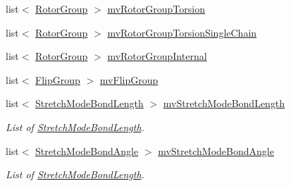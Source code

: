 \begin{DoxyCompactItemize}
\item 
list$<$ \mbox{\hyperlink{struct_obj_cryst_1_1_molecule_1_1_rotor_group}{Rotor\+Group}} $>$ \mbox{\hyperlink{class_obj_cryst_1_1_molecule_afc51d36109a8d96a626f3c2251345c13}{mv\+Rotor\+Group\+Torsion}}
\item 
list$<$ \mbox{\hyperlink{struct_obj_cryst_1_1_molecule_1_1_rotor_group}{Rotor\+Group}} $>$ \mbox{\hyperlink{class_obj_cryst_1_1_molecule_a22a07ddc2dbfeb90238b29bcca1e915d}{mv\+Rotor\+Group\+Torsion\+Single\+Chain}}
\item 
list$<$ \mbox{\hyperlink{struct_obj_cryst_1_1_molecule_1_1_rotor_group}{Rotor\+Group}} $>$ \mbox{\hyperlink{class_obj_cryst_1_1_molecule_ac54d8a074549f7710a1823b0ecefcde8}{mv\+Rotor\+Group\+Internal}}
\item 
list$<$ \mbox{\hyperlink{struct_obj_cryst_1_1_molecule_1_1_flip_group}{Flip\+Group}} $>$ \mbox{\hyperlink{class_obj_cryst_1_1_molecule_a79ffe8ba3222a5f4a56fd9f2447c8fd7}{mv\+Flip\+Group}}
\item 
\mbox{\label{class_obj_cryst_1_1_molecule_aa3e38a39a6a392456c03f320e1bdaffa}} 
list$<$ \mbox{\hyperlink{struct_obj_cryst_1_1_stretch_mode_bond_length}{Stretch\+Mode\+Bond\+Length}} $>$ \mbox{\hyperlink{class_obj_cryst_1_1_molecule_aa3e38a39a6a392456c03f320e1bdaffa}{mv\+Stretch\+Mode\+Bond\+Length}}
\begin{DoxyCompactList}\small\item\em List of \mbox{\hyperlink{struct_obj_cryst_1_1_stretch_mode_bond_length}{Stretch\+Mode\+Bond\+Length}}. \end{DoxyCompactList}\item 
\mbox{\label{class_obj_cryst_1_1_molecule_a5673efb9ae9ffc238f25c62805825c63}} 
list$<$ \mbox{\hyperlink{struct_obj_cryst_1_1_stretch_mode_bond_angle}{Stretch\+Mode\+Bond\+Angle}} $>$ \mbox{\hyperlink{class_obj_cryst_1_1_molecule_a5673efb9ae9ffc238f25c62805825c63}{mv\+Stretch\+Mode\+Bond\+Angle}}
\begin{DoxyCompactList}\small\item\em List of \mbox{\hyperlink{struct_obj_cryst_1_1_stretch_mode_bond_length}{Stretch\+Mode\+Bond\+Length}}. \end{DoxyCompactList}\item 
\mbox{\label{class_obj_cryst_1_1_molecule_a878336f175d85a68d55804ad43a453dc}} 

\end{DoxyCompactItemize}
